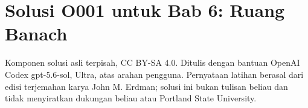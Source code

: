 
\section*{Solusi O001 untuk Bab 6: Ruang Banach}
\begin{center}
\small
Komponen solusi asli terpisah, CC BY-SA 4.0. Ditulis dengan bantuan
OpenAI Codex gpt-5.6-sol, Ultra, atas arahan pengguna. Pernyataan latihan
berasal dari edisi terjemahan karya John M. Erdman; solusi ini bukan tulisan
beliau dan tidak menyiratkan dukungan beliau atau Portland State University.
\end{center}

